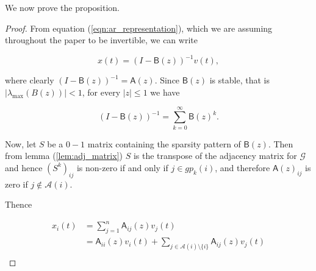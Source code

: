 \documentclass[12pt]{article}
\def\gcg{\mathcal{G}}  %
\def\B{\mathsf{B}}  %
\def\A{\mathsf{A}}  %
\newcommand{\anc}[1]{\mathcal{A}(#1)}  %
\newcommand{\gpn}[2]{gp_{#1}(#2)}  %
\begin{document}
We now prove the proposition.

\begin{proof}
  From equation (\ref{eqn:ar_representation}), which we are assuming
  throughout the paper to be invertible, we can write

  \begin{equation*}
    x(t) = (I - \B(z))^{-1} v(t),
  \end{equation*}

  where clearly $(I - \B(z))^{-1} = \A(z)$.  Since $\B(z)$ is stable,
  that is $|\lambda_{\text{max}}(B(z))| < 1$, for every $|z| \le 1$ we
  have

  \begin{equation*}
    (I - \B(z))^{-1} = \sum_{k = 0}^\infty \B(z)^k.
  \end{equation*}

  Now, let $S$ be a $0-1$ matrix containing the sparsity pattern of
  $\B(z)$.  Then from lemma (\ref{lem:adj_matrix}) $S$ is the
  transpose of the adjacency matrix for $\gcg$ and hence $(S^k)_{ij}$
  is non-zero if and only if $j \in \gpn{k}{i}$, and therefore
  $\A(z)_{ij}$ is zero if $j \not\in \anc{i}$.

  Thence

  \begin{align*}
    x_i(t) &= \sum_{j = 1}^n \A_{ij}(z) v_j(t)\\
    &= \A_{ii}(z) v_i(t) + \sum_{j \in \anc{i} \setminus \{i\}} \A_{ij}(z) v_j(t)\\
  \end{align*}

\end{proof}
\end{document}

